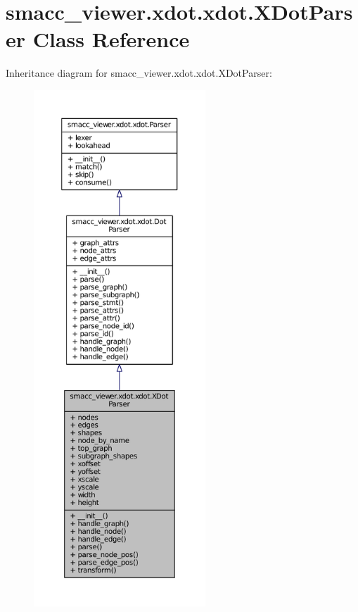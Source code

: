 \hypertarget{classsmacc__viewer_1_1xdot_1_1xdot_1_1XDotParser}{}\section{smacc\+\_\+viewer.\+xdot.\+xdot.\+X\+Dot\+Parser Class Reference}
\label{classsmacc__viewer_1_1xdot_1_1xdot_1_1XDotParser}


Inheritance diagram for smacc\+\_\+viewer.\+xdot.\+xdot.\+X\+Dot\+Parser\+:
\nopagebreak
\begin{figure}[H]
\begin{center}
\leavevmode
\includegraphics[height=550pt]{classsmacc__viewer_1_1xdot_1_1xdot_1_1XDotParser__inherit__graph}
\end{center}
\end{figure}


